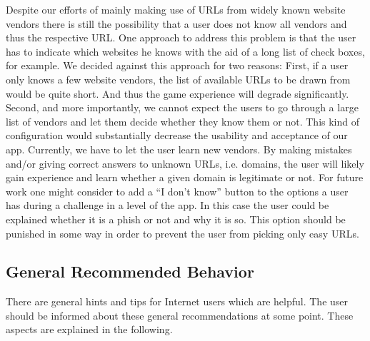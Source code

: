 \begin{description}[leftmargin=0cm]
\item[Unknown Website Vendors] Despite our efforts of mainly making use of URLs from widely known website vendors there is still the possibility that a user does not know all vendors and thus the respective URL. 
One approach to address this problem is that the user has to indicate which websites he knows with the aid of a long list of check boxes, for example. 
We decided against this approach for two reasons: 
First, if a user only knows a few website vendors, the list of available URLs to be drawn from would be quite short. 
And thus the game experience will degrade significantly. 
Second, and more importantly, we cannot expect the users to go through a large list of vendors and let them decide whether they know them or not. 
This kind of configuration would substantially decrease the usability and acceptance of our app. 
Currently, we have to let the user learn new vendors. 
By making mistakes and/or giving correct answers to unknown URLs, i.e. domains, the user will likely gain experience and learn whether a given domain is legitimate or not. 
For future work one might consider to add a ``I don't know'' button to the options a user has during a challenge in a level of the app.
In this case the user could be explained whether it is a phish or not and why it is so.
This option should be punished in some way in order to prevent the user from picking only easy URLs.
\end{description}


\subsection{General Recommended Behavior}
There are general hints and tips for Internet users which are helpful.
The user should be informed about these general recommendations at some point.
These aspects are explained in the following.


